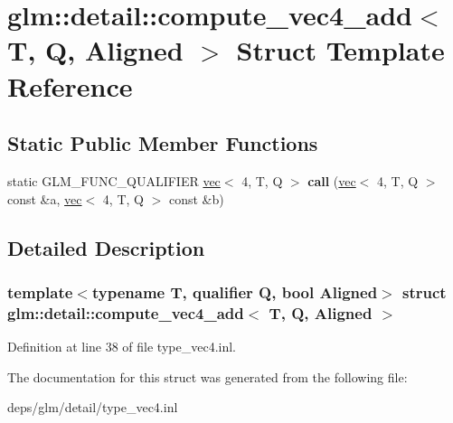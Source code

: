 \hypertarget{structglm_1_1detail_1_1compute__vec4__add}{}\section{glm\+:\+:detail\+:\+:compute\+\_\+vec4\+\_\+add$<$ T, Q, Aligned $>$ Struct Template Reference}
\label{structglm_1_1detail_1_1compute__vec4__add}
\subsection*{Static Public Member Functions}
\begin{DoxyCompactItemize}
\item 
\mbox{\label{structglm_1_1detail_1_1compute__vec4__add_a31e900b7f6b77e1053d4488b6fb81715}} 
static G\+L\+M\+\_\+\+F\+U\+N\+C\+\_\+\+Q\+U\+A\+L\+I\+F\+I\+ER \hyperlink{structglm_1_1vec}{vec}$<$ 4, T, Q $>$ {\bfseries call} (\hyperlink{structglm_1_1vec}{vec}$<$ 4, T, Q $>$ const \&a, \hyperlink{structglm_1_1vec}{vec}$<$ 4, T, Q $>$ const \&b)
\end{DoxyCompactItemize}


\subsection{Detailed Description}
\subsubsection*{template$<$typename T, qualifier Q, bool Aligned$>$\newline
struct glm\+::detail\+::compute\+\_\+vec4\+\_\+add$<$ T, Q, Aligned $>$}



Definition at line 38 of file type\+\_\+vec4.\+inl.



The documentation for this struct was generated from the following file\+:\begin{DoxyCompactItemize}
\item 
deps/glm/detail/type\+\_\+vec4.\+inl\end{DoxyCompactItemize}

